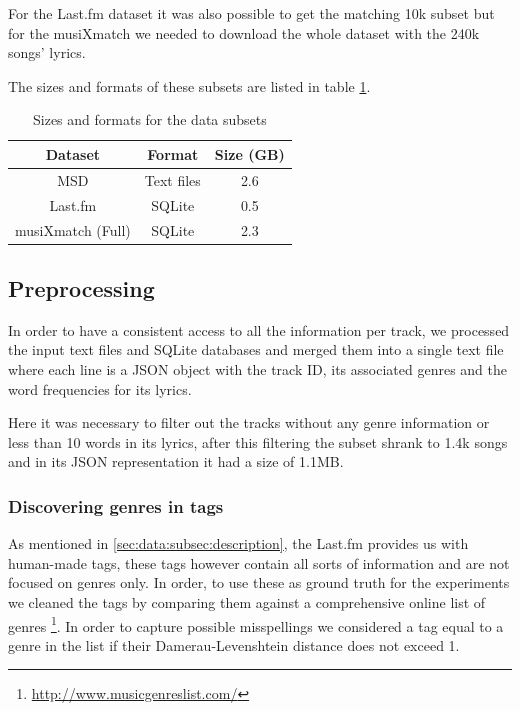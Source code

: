 \documentclass[10pt,a4paper]{scrartcl}
\begin{document}
    For the Last.fm dataset it was also possible to get the matching 10k
    subset but for the musiXmatch we needed to download the whole dataset
    with the 240k songs' lyrics.
    
    The sizes and formats of these subsets are listed in table
    \ref{tab:size_subset}.

    \begin{table}
      \centering
      \caption{Sizes and formats for the data subsets}
      \begin{tabular}{|c|c|c|}
      \hline
      Dataset & Format & Size (GB) \\
      \hline
      MSD & Text files & 2.6 \\
      Last.fm & SQLite & 0.5 \\
      musiXmatch (Full) & SQLite & 2.3 \\
      \hline
      \end{tabular}
      \label{tab:size_subset}
    \end{table}

    \subsection{Preprocessing}
      In order to have a consistent access to all the information per track,
      we processed the input text files and SQLite databases and merged them
      into a single text file where each line is a JSON object with the
      track ID, its associated genres and the word frequencies for its
      lyrics.
      
      Here it was necessary to filter out the tracks without any genre information
      or less than 10 words in its lyrics, after this filtering the subset
      shrank to 1.4k songs and in its JSON representation it had a size of 1.1MB.
      
      \subsubsection{Discovering genres in tags}    
        As mentioned in \ref{sec:data:subsec:description}, the Last.fm provides us
        with human-made tags, these tags however contain all sorts of information
        and are not focused on genres only. In order, to use these
        as ground truth for the experiments we cleaned the tags by comparing
        them against a comprehensive online list of genres
        \footnote{\url{http://www.musicgenreslist.com/}}.
        In order to capture possible misspellings we considered a tag equal to
        a genre in the list if their Damerau-Levenshtein distance
        does not exceed 1.
      
\end{document}
